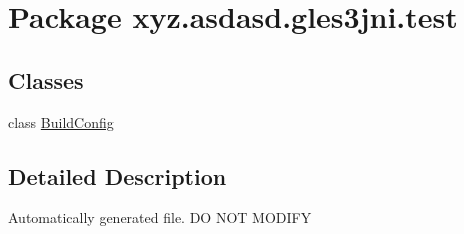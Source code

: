 \hypertarget{namespacexyz_1_1asdasd_1_1gles3jni_1_1test}{}\section{Package xyz.\+asdasd.\+gles3jni.\+test}
\label{namespacexyz_1_1asdasd_1_1gles3jni_1_1test}
\subsection*{Classes}
\begin{DoxyCompactItemize}
\item 
class \hyperlink{classxyz_1_1asdasd_1_1gles3jni_1_1test_1_1_build_config}{Build\+Config}
\end{DoxyCompactItemize}


\subsection{Detailed Description}
Automatically generated file. DO N\+OT M\+O\+D\+I\+FY 